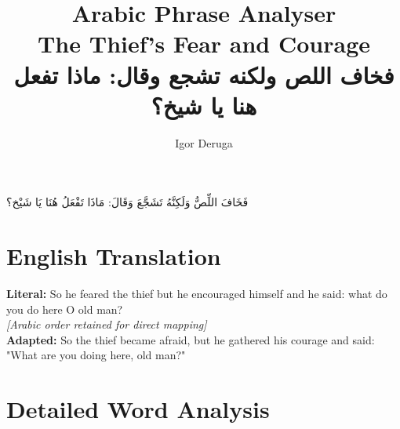 \documentclass[letterpaper,12pt]{article}
\begin{document}
\title{\textbf{\Large Arabic Phrase Analyser}\\
\large The Thief's Fear and Courage\\
\normalsize \textarabic{فخاف اللص ولكنه تشجع وقال: ماذا تفعل هنا يا شيخ؟}}
\author{Igor Deruga}
\date{}
\maketitle

\begin{tcolorbox}[colback=boxcolor,colframe=headercolor,title=\textbf{Arabic Phrase with Full Diactrics},breakable]
\centering
\textarabic{فَخَافَ اللِّصُّ وَلَكِنَّهُ تَشَجَّعَ وَقَالَ: مَاذَا تَفْعَلُ هُنَا يَا شَيْخ؟}
\end{tcolorbox}

\section{English Translation}
\begin{tcolorbox}[colback=white,colframe=accentcolor,breakable]
\textbf{Literal:} So he feared the thief but he encouraged himself and he said: what do you do here O old man? \\
\textit{[Arabic order retained for direct mapping]}\\[0.5em]
\textbf{Adapted:} So the thief became afraid, but he gathered his courage and said: "What are you doing here, old man?"
\end{tcolorbox}

\section{Detailed Word Analysis}
\end{document}
